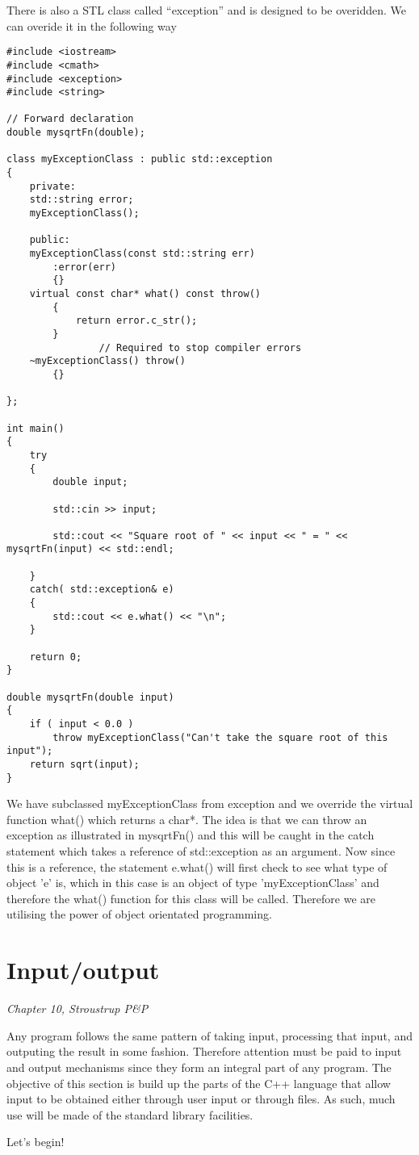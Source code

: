 There is also a STL class called ``exception'' and is designed to be
overidden. We can overide it in the following way
\begin{lstlisting}
#include <iostream>
#include <cmath>
#include <exception>
#include <string>

// Forward declaration 
double mysqrtFn(double);

class myExceptionClass : public std::exception
{
	private:
	std::string error;
	myExceptionClass();

	public:
	myExceptionClass(const std::string err)
		:error(err)
		{}
	virtual const char* what() const throw()
		{
			return error.c_str();
		}
                // Required to stop compiler errors
	~myExceptionClass() throw() 
		{}
	
};

int main()
{
	try
	{
		double input;
		
		std::cin >> input;
		
		std::cout << "Square root of " << input << " = " << mysqrtFn(input) << std::endl;
		
	}
	catch( std::exception& e)
	{
		std::cout << e.what() << "\n";
	}
	
	return 0;
}

double mysqrtFn(double input)
{
	if ( input < 0.0 )
		throw myExceptionClass("Can't take the square root of this input");
	return sqrt(input);
}
\end{lstlisting}
We have subclassed myExceptionClass from exception and we override the
virtual function what() which returns a char*. The idea is that we can
throw an exception as illustrated in mysqrtFn() and this will be
caught in the catch statement which takes a reference of
std::exception as an argument. Now since this is a reference, the
statement e.what() will first check to see what type of object 'e' is,
which in this case is an object of type 'myExceptionClass' and
therefore the what() function for this class will be called. Therefore
we are utilising the power of object orientated programming. 


\section{Input/output}
\label{sec:inputoutput}

\textit{Chapter 10, Stroustrup P\&P}

Any program follows the same pattern of taking input, processing that
input, and outputing the result in some fashion. Therefore attention
must be paid to input and output mechanisms since they form an
integral part of any program. The objective of this section is build
up the parts of the C++ language that allow input to be obtained
either through user input or through files. As such, much use will be
made of the standard library facilities. 

Let's begin!



